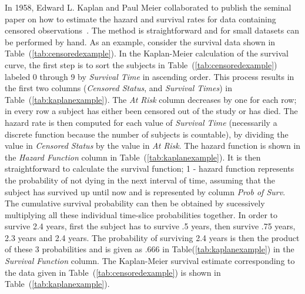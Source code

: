 \documentclass[10pt,letterpaper]{article}
\begin{document}
In 1958, Edward L. Kaplan and Paul Meier collaborated to publish the seminal paper on how to estimate the hazard and survival rates for data containing censored observations~\cite{Kaplan1958457}.
The method is straightforward and for small datasets can be performed by hand. As an example, consider the survival data shown  in Table~(\ref{tab:censoredexample}). In the Kaplan-Meier calculation of the survival curve, the first step is to  
sort the subjects in Table~(\ref{tab:censoredexample}) labeled 0 through 9 by \emph{Survival Time} in ascending order.  
This process results in the first two columns (\emph{Censored Status}, and \emph{Survival Times}) in Table~(\ref{tab:kaplanexample}).
The \emph{At Risk} column decreases by one for each row; in every row a subject has either been censored out of the study or has died. The hazard rate is then computed for each value of \emph{Survival Time} (necessarily a discrete function because the number of subjects is countable), by dividing the value in \emph{Censored Status} by the value in 
\emph{At Risk}. The hazard function is shown in the \emph{Hazard Function} column in Table~(\ref{tab:kaplanexample}).
It is then straightforward to calculate the survival function; 1 - hazard function represents the probability of not dying in the next interval of time, assuming that the subject has survived up until now and is represented by column \emph{Prob of Surv}. 
The cumulative survival probability can then be obtained by sucessively multiplying all these individual time-slice probabilities together. In order to survive 2.4 years, first the subject has to survive .5 years, then survive .75 years, 2.3 years and 2.4 years. The probability of surviving 2.4 years is then the product of these 3 probabilities and is given as .666 in Table(\ref{tab:kaplanexample}) in the \emph{Survival Function} column.
The Kaplan-Meier survival estimate corresponding to the data given in Table~(\ref{tab:censoredexample}) is shown in Table~(\ref{tab:kaplanexample}).
\end{document}
